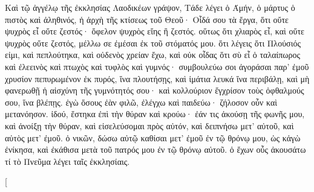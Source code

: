 \begin{pages}
\begin{Leftside}
		Καὶ τῷ ἀγγέλῳ τῆς ἐκκλησίας Λαοδικέων γράψον, Τάδε λέγει ὁ Άμήν, ὁ μάρτυς ὁ πιστὸς καὶ ἀληθινός, ἡ ἀρχὴ τῆς κτίσεως τοῦ Θεοῦ· Οἶδά σου τὰ ἔργα, ὅτι οὔτε ψυχρὸς εἶ οὔτε ζεστός· ὄφελον ψυχρὸς εἴης ἢ ζεστός. οὕτως ὅτι χλιαρὸς εἶ, καὶ οὔτε ψυχρὸς οὔτε ζεστός, μέλλω σε ἐμέσαι ἐκ τοῦ στόματός μου. ὅτι λέγεις ὅτι Πλούσιός εἰμι, καὶ πεπλούτηκα, καὶ οὐδενὸς χρείαν ἔχω, καὶ οὐκ οἶδας ὅτι σὺ εἶ ὁ ταλαίπωρος καὶ ἐλεεινὸς καὶ πτωχὸς καὶ τυφλὸς καὶ γυμνός· συμβουλεύω σοι ἀγοράσαι παρ’ ἐμοῦ χρυσίον πεπυρωμένον ἐκ πυρός, ἵνα πλουτήσῃς, καὶ ἱμάτια λευκά ἵνα περιβάλῃ, καὶ μὴ φανερωθῇ ἡ αἰσχύνη τῆς γυμνότητός σου· καὶ κολλούριον ἔγχρίσον τοὺς ὀφθαλμούς σου, ἵνα βλέπῃς. ἐγὼ ὅσους ἐὰν φιλῶ, ἐλέγχω καὶ παιδεύω· ζήλοσον οὖν καὶ μετανόησον. ἰδού, ἕστηκα ἐπὶ τὴν θύραν καὶ κρούω· ἐάν τις ἀκούσῃ τῆς φωνῆς μου, καὶ ἀνοίξῃ τὴν θύραν, καὶ εἰσελεύσομαι πρὸς αὐτόν, καὶ δειπνήσω μετ’ αὐτοῦ, καὶ αὐτὸς μετ’ ἐμοῦ. ὁ νικῶν, δώσω αὐτῷ καθίσαι μετ’ ἐμοῦ ἐν τῷ θρόνῳ μου, ὡς κἀγὼ ἐνίκησα, καὶ ἐκάθισα μετὰ τοῦ πατρός μου ἐν τῷ θρόνῳ αὐτοῦ. ὁ ἔχων οὖς ἀκουσάτω τί τὸ Πνεῦμα λέγει ταῖς ἐκκλησίαις.
		\pend
        \endnumbering
    \end{Leftside}
    \begin{Rightside}
        \beginnumbering
        \pstart[

\end{Rightside}
\end{pages}
